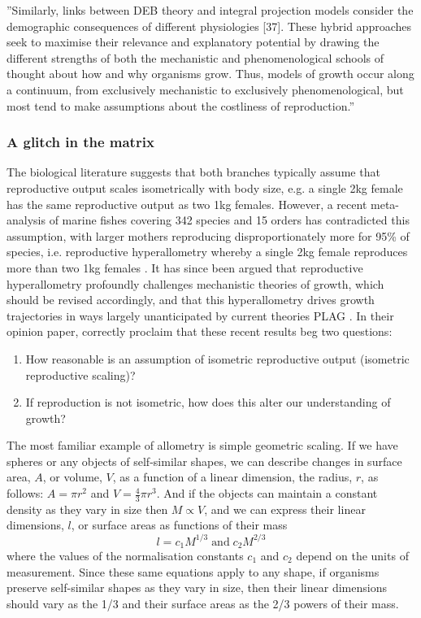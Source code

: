\documentclass[a4paper]{article} %
\begin{document}
        ''Similarly, links between DEB theory and integral projection models consider the demographic consequences of different physiologies [37]. These hybrid approaches seek to maximise their relevance and explanatory potential by drawing the different strengths of both the mechanistic and phenomenological schools of thought about how and why organisms grow. Thus, models of growth occur along a continuum, from exclusively mechanistic to exclusively phenomenological, but most tend to make assumptions about the costliness of reproduction.''

        \subsubsection{A glitch in the matrix}

        The biological literature suggests that both branches typically assume that reproductive output scales isometrically with body size, e.g. a single 2kg female has the same reproductive output as two 1kg females. However, a recent meta-analysis of marine fishes covering 342 species and 15 orders has contradicted this assumption, with larger mothers reproducing disproportionately more for 95\% of species, i.e. reproductive hyperallometry whereby a single 2kg female reproduces more than two 1kg females \autocite{Barneche2018d}. It has since been argued that reproductive hyperallometry profoundly challenges mechanistic theories of growth, which should be revised accordingly, and that this hyperallometry drives growth trajectories in ways largely unanticipated by current theories PLAG \autocite{Marshall2019b}. In their opinion paper, \cite{Marshall2019b} correctly proclaim that these recent results beg two questions:
        \begin{enumerate}
            \item How reasonable is an assumption of isometric reproductive output (isometric reproductive scaling)?
            \item If reproduction is not isometric, how does this alter our understanding of growth?
        \end{enumerate}


        The most familiar example of allometry is simple geometric scaling. If we have spheres or any objects of self-similar shapes, we can describe changes in surface area, $A$, or volume, $V$, as a function of a linear dimension, the radius, $r$, as follows: $A = \pi r^2$ and $V = \frac{4}{3}\pi r^3$. And if the objects can maintain a constant density as they vary in size then $M \propto V$, and we can express their linear dimensions, $l$, or surface areas as functions of their mass
        \begin{equation}
            l = c_{1}M^{1/3} \; \text{and} \; c_{2}M^{2/3}
        \end{equation}
        where the values of the normalisation constants $c_1$ and $c_2$ depend on the units of measurement. Since these same equations apply to any shape, if organisms preserve self-similar shapes as they vary in size, then their linear dimensions should vary as the 1/3 and their surface areas as the 2/3 powers of their mass.
        
\end{document}
